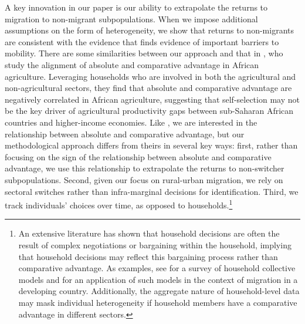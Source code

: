 A key innovation in our paper is our ability to extrapolate the returns to migration to non-migrant subpopulations. 
When we impose additional assumptions on the form of heterogeneity, we show that returns to non-migrants are consistent with the evidence that finds evidence of important barriers to mobility.
There are some similarities between our approach and that in \cite{alvarez-cuadradoSelectionAbsoluteAdvantage2023}, who study the alignment of absolute and comparative advantage in African agriculture.
Leveraging households who are involved in both the agricultural and non-agricultural sectors, they find that absolute and comparative advantage are negatively correlated in African agriculture, suggesting that self-selection may not be the key driver of agricultural productivity gaps between sub-Saharan African countries and higher-income economies.
Like \cite{alvarez-cuadradoSelectionAbsoluteAdvantage2023}, we are interested in the relationship between absolute and comparative advantage, but our methodological approach differs from theirs in several key ways: first, rather than focusing on the sign of the relationship between absolute and comparative advantage, we use this relationship to extrapolate the returns to non-switcher subpopulations.
Second, given our focus on rural-urban migration, we rely on sectoral switches rather than infra-marginal decisions for identification. 
Third, we track individuals' choices over time, as opposed to households.\footnote{An extensive literature has shown that household decisions are often the result of complex negotiations or bargaining within the household, implying that household decisions may reflect this bargaining process rather than comparative advantage. 
As examples, see \cite{vermeulenCollectiveHouseholdModels2002} for a survey of household collective models and \cite{chenIdentifyingNoncooperativeBehavior2013} for an application of such models in the context of migration in a developing country. 
Additionally, the aggregate nature of household-level data may mask individual heterogeneity if household members have a comparative advantage in different sectors.}


